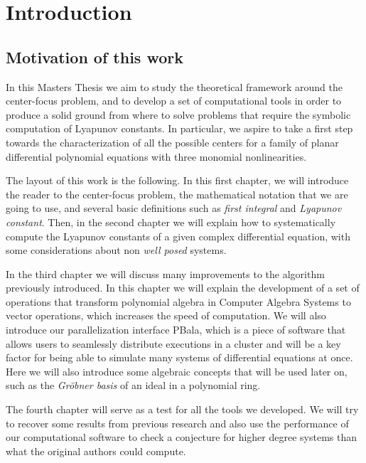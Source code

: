 \chapter{Introduction}

\section{Motivation of this work}

In this Masters Thesis we aim to study the theoretical framework around the center-focus problem, and to develop a set of computational tools in order to produce a solid ground from where to solve problems that require the symbolic computation of Lyapunov constants. In particular, we aspire to take a first step towards the characterization of all the possible centers for a family of planar differential polynomial equations with three monomial nonlinearities.

The layout of this work is the following. In this first chapter, we will introduce the reader to the center-focus problem, the mathematical notation that we are going to use, and several basic definitions such as \emph{first integral} and \emph{Lyapunov constant}. Then, in the second chapter we will explain how to systematically compute the Lyapunov constants of a given complex differential equation, with some considerations about non \emph{well posed} systems.

In the third chapter we will discuss many improvements to the algorithm previously introduced. In this chapter we will explain the development of a set of operations that transform polynomial algebra in Computer Algebra Systems to vector operations, which increases the speed of computation. We will also introduce our parallelization interface PBala, which is a piece of software that allows users to seamlessly distribute executions in a cluster and will be a key factor for being able to simulate many systems of differential equations at once. Here we will also introduce some algebraic concepts that will be used later on, such as the \emph{Gröbner basis} of an ideal in a polynomial ring.

The fourth chapter will serve as a test for all the tools we developed. We will try to recover some results from previous research and also use the performance of our computational software to check a conjecture for higher degree systems than what the original authors could compute.

